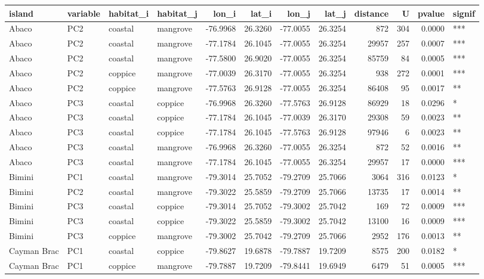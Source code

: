 
\begin{tabular}{llllrrrrrrrl}
\toprule
island & variable & habitat\_i & habitat\_j & lon\_i & lat\_i & lon\_j & lat\_j & distance & U & pvalue & signif\\
\midrule
Abaco & PC2 & coastal & mangrove & -76.9968 & 26.3260 & -77.0055 & 26.3254 & 872 & 304 & 0.0000 & ***\\
Abaco & PC2 & coastal & mangrove & -77.1784 & 26.1045 & -77.0055 & 26.3254 & 29957 & 257 & 0.0007 & ***\\
Abaco & PC2 & coastal & mangrove & -77.5800 & 26.9020 & -77.0055 & 26.3254 & 85759 & 84 & 0.0005 & ***\\
Abaco & PC2 & coppice & mangrove & -77.0039 & 26.3170 & -77.0055 & 26.3254 & 938 & 272 & 0.0001 & ***\\
Abaco & PC2 & coppice & mangrove & -77.5763 & 26.9128 & -77.0055 & 26.3254 & 86408 & 95 & 0.0017 & **\\
\addlinespace
Abaco & PC3 & coastal & coppice & -76.9968 & 26.3260 & -77.5763 & 26.9128 & 86929 & 18 & 0.0296 & *\\
Abaco & PC3 & coastal & coppice & -77.1784 & 26.1045 & -77.0039 & 26.3170 & 29308 & 59 & 0.0023 & **\\
Abaco & PC3 & coastal & coppice & -77.1784 & 26.1045 & -77.5763 & 26.9128 & 97946 & 6 & 0.0023 & **\\
Abaco & PC3 & coastal & mangrove & -76.9968 & 26.3260 & -77.0055 & 26.3254 & 872 & 52 & 0.0016 & **\\
Abaco & PC3 & coastal & mangrove & -77.1784 & 26.1045 & -77.0055 & 26.3254 & 29957 & 17 & 0.0000 & ***\\
\addlinespace
Bimini & PC1 & coastal & mangrove & -79.3014 & 25.7052 & -79.2709 & 25.7066 & 3064 & 316 & 0.0123 & *\\
Bimini & PC2 & coastal & mangrove & -79.3022 & 25.5859 & -79.2709 & 25.7066 & 13735 & 17 & 0.0014 & **\\
Bimini & PC3 & coastal & coppice & -79.3014 & 25.7052 & -79.3002 & 25.7042 & 169 & 72 & 0.0009 & ***\\
Bimini & PC3 & coastal & coppice & -79.3022 & 25.5859 & -79.3002 & 25.7042 & 13100 & 16 & 0.0009 & ***\\
Bimini & PC3 & coppice & mangrove & -79.3002 & 25.7042 & -79.2709 & 25.7066 & 2952 & 176 & 0.0013 & **\\
\addlinespace
Cayman Brac & PC1 & coastal & coppice & -79.8627 & 19.6878 & -79.7887 & 19.7209 & 8575 & 200 & 0.0182 & *\\
Cayman Brac & PC1 & coppice & mangrove & -79.7887 & 19.7209 & -79.8441 & 19.6949 & 6479 & 51 & 0.0005 & ***\\

\end{tabular}
